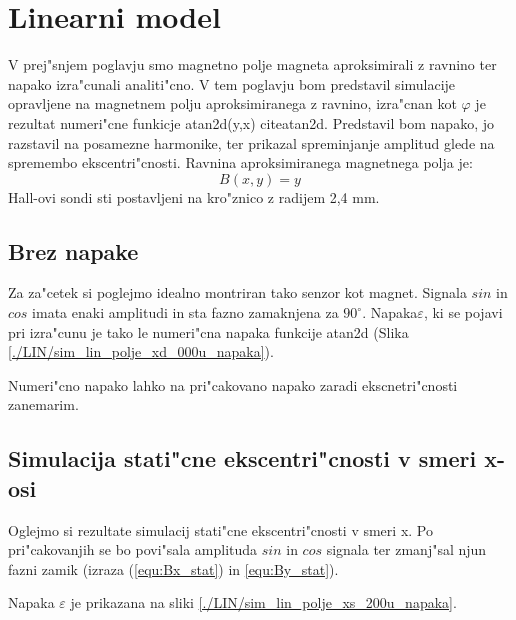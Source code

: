 \chapter{Linearni model}

V prej"snjem poglavju smo magnetno polje magneta aproksimirali z ravnino ter napako izra"cunali analiti"cno. V tem poglavju bom predstavil simulacije opravljene na magnetnem polju aproksimiranega z ravnino, izra"cnan kot $\varphi$ je rezultat numeri"cne funkicje atan2d(y,x) citeatan2d. Predstavil bom napako, jo razstavil na posamezne harmonike, ter prikazal spreminjanje amplitud glede na spremembo ekscentri"cnosti. Ravnina aproksimiranega magnetnega polja je: 
\begin{equation}
\label{equ:lin_polje}
B(x,y)=y
\end{equation}
Hall-ovi sondi sti postavljeni na kro"znico z radijem 2,4 mm.


\section{Brez napake}

Za za"cetek si poglejmo idealno montriran tako senzor kot magnet. Signala $sin$ in $cos$ imata enaki amplitudi in sta fazno zamaknjena za $90^{\circ}$. Napaka$\varepsilon$, ki se pojavi pri izra"cunu je tako le numeri"cna napaka funkcije atan2d (Slika \ref{./LIN/sim_lin_polje_xd_000u_napaka}).

Numeri"cno napako lahko na pri"cakovano napako zaradi ekscnetri"cnosti zanemarim.



\section{Simulacija stati"cne ekscentri"cnosti v smeri x-osi}

Oglejmo si rezultate simulacij stati"cne ekscentri"cnosti v smeri x. Po pri"cakovanjih se bo povi"sala amplituda $sin$ in $cos$ signala ter zmanj"sal njun fazni zamik (izraza (\ref{equ:Bx_stat}) in \ref{equ:By_stat}).
 
\newpage
Napaka $\varepsilon$  je prikazana na sliki \ref{./LIN/sim_lin_polje_xs_200u_napaka}.


